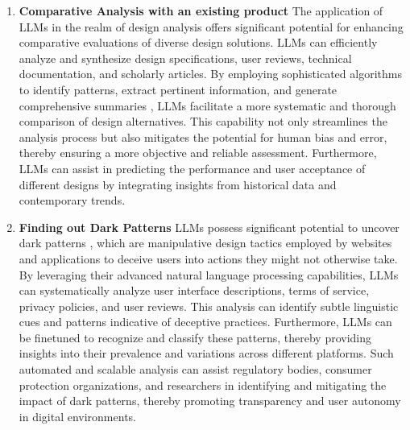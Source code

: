 \documentclass{article}
\begin{document}
\begin{enumerate}
    \item \textbf{Comparative Analysis with an existing product}
    The application of LLMs in the realm of design analysis offers significant potential for enhancing comparative evaluations of diverse design solutions. LLMs can efficiently analyze and synthesize design specifications, user reviews, technical documentation, and scholarly articles. By employing sophisticated algorithms to identify patterns, extract pertinent information, and generate comprehensive summaries \cite{chew2023llm}, LLMs facilitate a more systematic and thorough comparison of design alternatives. This capability not only streamlines the analysis process but also mitigates the potential for human bias and error, thereby ensuring a more objective and reliable assessment. Furthermore, LLMs can assist in predicting the performance and user acceptance of different designs by integrating insights from historical data and contemporary trends. 
    \item \textbf{Finding out Dark Patterns}
    LLMs possess significant potential to uncover dark patterns  \cite{gray2018dark}, which are manipulative design tactics employed by websites and applications to deceive users into actions they might not otherwise take. By leveraging their advanced natural language processing capabilities, LLMs can systematically analyze user interface descriptions, terms of service, privacy policies, and user reviews. This analysis can identify subtle linguistic cues and patterns indicative of deceptive practices. Furthermore, LLMs can be finetuned to recognize and classify these patterns, thereby providing insights into their prevalence and variations across different platforms. Such automated and scalable analysis can assist regulatory bodies, consumer protection organizations, and researchers in identifying and mitigating the impact of dark patterns, thereby promoting transparency and user autonomy in digital environments.
\end{enumerate}


\end{document}
